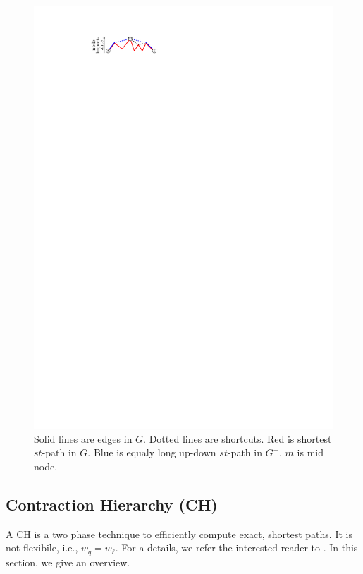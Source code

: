 \documentclass[letterpaper]{article} %
\begin{document}
\begin{figure}
\centering
\includegraphics{fig/ch}
\caption{
Solid lines are edges in $G$. Dotted lines are shortcuts. Red is shortest $st$-path in $G$. Blue is equaly long up-down $st$-path in $G^+$. $m$ is mid node.
}
\label{fig:ch}
\end{figure}

\subsection{Contraction Hierarchy (CH)}

A CH is a two phase technique to efficiently compute exact, shortest paths.
It is not flexibile, i.e., $w_q=w_\ell$.
For a details, we refer the interested reader to \cite{gssv-erlrn-12,dsw-cch-15}.
In this section, we give an overview.
\end{document}
